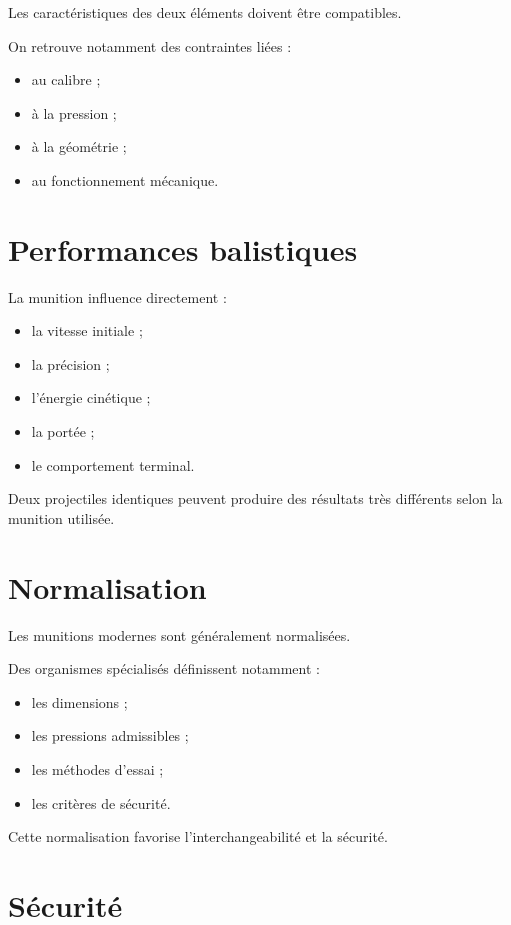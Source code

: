 Les caractéristiques des deux éléments doivent être compatibles.

On retrouve notamment des contraintes liées :

\begin{itemize}
    \item au calibre ;
    \item à la pression ;
    \item à la géométrie ;
    \item au fonctionnement mécanique.
\end{itemize}

\section{Performances balistiques}

La munition influence directement :

\begin{itemize}
    \item la vitesse initiale ;
    \item la précision ;
    \item l'énergie cinétique ;
    \item la portée ;
    \item le comportement terminal.
\end{itemize}

Deux projectiles identiques peuvent produire des résultats très différents
selon la munition utilisée.

\section{Normalisation}

Les munitions modernes sont généralement normalisées.

Des organismes spécialisés définissent notamment :

\begin{itemize}
    \item les dimensions ;
    \item les pressions admissibles ;
    \item les méthodes d'essai ;
    \item les critères de sécurité.
\end{itemize}

Cette normalisation favorise l'interchangeabilité et la sécurité.

\section{Sécurité}

